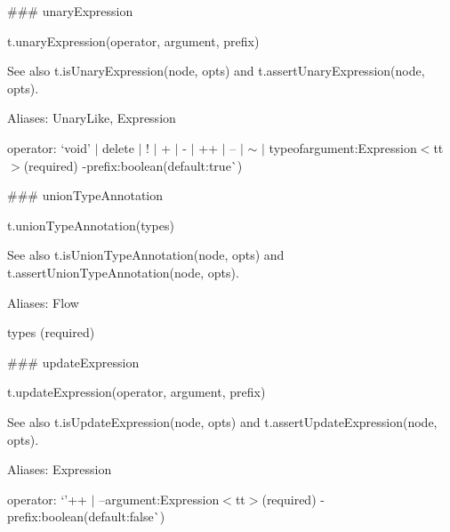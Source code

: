 \#\#\# unary\+Expression 
\begin{DoxyCode}
t.unaryExpression(operator, argument, prefix)
\end{DoxyCode}


See also {\ttfamily t.\+is\+Unary\+Expression(node, opts)} and {\ttfamily t.\+assert\+Unary\+Expression(node, opts)}.

Aliases\+: {\ttfamily Unary\+Like}, {\ttfamily Expression}


\begin{DoxyItemize}
\item {\ttfamily operator}\+: `\textquotesingle{}void' $\vert$ \textquotesingle{}delete\textquotesingle{} $\vert$ \textquotesingle{}!\textquotesingle{} $\vert$ \textquotesingle{}+\textquotesingle{} $\vert$ \textquotesingle{}-\/\textquotesingle{} $\vert$ \textquotesingle{}++\textquotesingle{} $\vert$ \textquotesingle{}--\textquotesingle{} $\vert$ \textquotesingle{}$\sim$\textquotesingle{} $\vert$ \textquotesingle{}typeofargument{\ttfamily \+:}Expression$<$tt$>$(required) -\/prefix{\ttfamily \+:}boolean{\ttfamily (default\+:}true\`{}) 


\end{DoxyItemize}

\#\#\# union\+Type\+Annotation 
\begin{DoxyCode}
t.unionTypeAnnotation(types)
\end{DoxyCode}


See also {\ttfamily t.\+is\+Union\+Type\+Annotation(node, opts)} and {\ttfamily t.\+assert\+Union\+Type\+Annotation(node, opts)}.

Aliases\+: {\ttfamily Flow}


\begin{DoxyItemize}
\item {\ttfamily types} (required) 


\end{DoxyItemize}

\#\#\# update\+Expression 
\begin{DoxyCode}
t.updateExpression(operator, argument, prefix)
\end{DoxyCode}


See also {\ttfamily t.\+is\+Update\+Expression(node, opts)} and {\ttfamily t.\+assert\+Update\+Expression(node, opts)}.

Aliases\+: {\ttfamily Expression}


\begin{DoxyItemize}
\item {\ttfamily operator}\+: `'++\textquotesingle{} $\vert$ \textquotesingle{}--argument{\ttfamily \+:}Expression$<$tt$>$(required) -\/prefix{\ttfamily \+:}boolean{\ttfamily (default\+:}false\`{}) 


\end{DoxyItemize}

